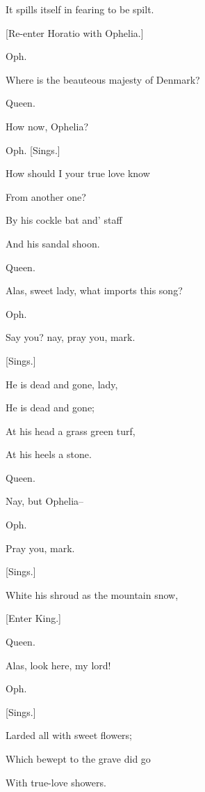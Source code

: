 \documentclass[12pt]{book}
\begin{document}
It spills itself in fearing to be spilt.



[Re-enter Horatio with Ophelia.]



Oph.

Where is the beauteous majesty of Denmark?



Queen.

How now, Ophelia?



Oph. [Sings.]

   How should I your true love know

     From another one?

   By his cockle bat and' staff

     And his sandal shoon.



Queen.

Alas, sweet lady, what imports this song?



Oph.

Say you? nay, pray you, mark.

[Sings.]

   He is dead and gone, lady,

     He is dead and gone;

   At his head a grass green turf,

     At his heels a stone.



Queen.

Nay, but Ophelia--



Oph.

Pray you, mark.

[Sings.]

   White his shroud as the mountain snow,



[Enter King.]



Queen.

Alas, look here, my lord!



Oph.

[Sings.]

     Larded all with sweet flowers;

   Which bewept to the grave did go

     With true-love showers.
\end{document}
